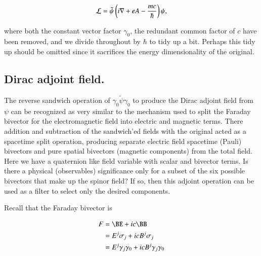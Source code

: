 \begin{align}\label{eqn:diracLag:lag3}
\mathcal{L} = \tilde{\psi} \left( i \nabla + e A - \frac{mc}{\hbar} \right) \psi,
\end{align}

where both the constant vector factor $\gamma_0$, the redundant common factor of $c$ have been removed, and we divide throughout by $\hbar$ to tidy up a bit.  Perhaps this tidy up should be omitted since it sacrifices the 
energy dimensionality of the original.

\subsection{Dirac adjoint field. }


The reverse sandwich operation of $\gamma_0 \tilde{\psi} \gamma_0$ to produce the Dirac adjoint field from $\psi$ 
can be recognized 
as very similar to the mechanism used to split the Faraday bivector for the electromagnetic field into electric and magnetic terms.  There addition and subtraction of the sandwich'ed fields with the original acted as a spacetime split operation, producing separate electric field spacetime (Pauli) bivectors and pure spatial bivectors (magnetic components) from the total field.  Here we have a
quaternion like field variable with scalar and bivector terms.  Is there a physical (observables) significance 
only for a subset of the six possible bivectors that make up the spinor field?
If so, then this adjoint operation can be used as a filter to select only the desired components.

Recall that the Faraday bivector is

\begin{align*}
F 
&= \BE + i c \BB \\
&= E^j \sigma_j + i c B^j \sigma_j \\
&= E^j \gamma_j \gamma_0 + i c B^j \gamma_j \gamma_0 \\
\end{align*}

